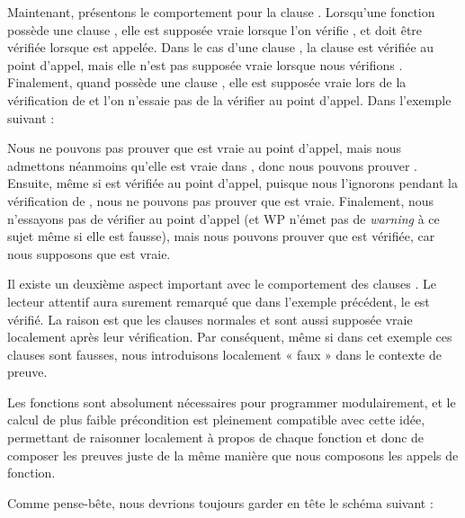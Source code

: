 Maintenant, présentons le comportement pour la clause .
Lorsqu'une fonction  possède une clause ,
elle est supposée vraie lorsque l'on vérifie , et doit être
vérifiée lorsque  est appelée. Dans le cas d'une clause
, la clause est vérifiée au point d'appel, mais elle
n'est pas supposée vraie lorsque nous vérifions . Finalement,
quand  possède une clause , elle est
supposée vraie lors de la vérification de  et l'on n'essaie pas
de la vérifier au point d'appel. Dans l'exemple suivant :



Nous ne pouvons pas prouver que  est vraie au point d'appel, mais
nous admettons néanmoins qu'elle est vraie dans , donc nous
pouvons prouver . Ensuite, même si  est vérifiée
au point d'appel, puisque nous l'ignorons pendant la vérification de
, nous ne pouvons pas prouver que  est vraie.
Finalement, nous n'essayons pas de vérifier  au point d'appel
(et WP n'émet pas de \textit{warning} à ce sujet même si elle est fausse), mais
nous pouvons prouver que  est vérifiée, car nous supposons que
 est vraie.


Il existe un deuxième aspect important avec le comportement des clauses
. Le lecteur attentif aura surement remarqué que dans
l'exemple précédent, le  est vérifié.
La raison est que les clauses  normales et
 sont aussi supposée vraie localement après leur vérification.
Par conséquent, même si dans cet exemple ces clauses sont fausses, nous
introduisons localement « faux » dans le contexte de preuve.




Les fonctions sont absolument nécessaires pour programmer modulairement, et le calcul
de plus faible précondition est pleinement compatible avec cette idée, permettant de
raisonner localement à propos de chaque fonction et donc de composer les preuves juste
de la même manière que nous composons les appels de fonction.


Comme pense-bête, nous devrions toujours garder en tête le schéma suivant :


